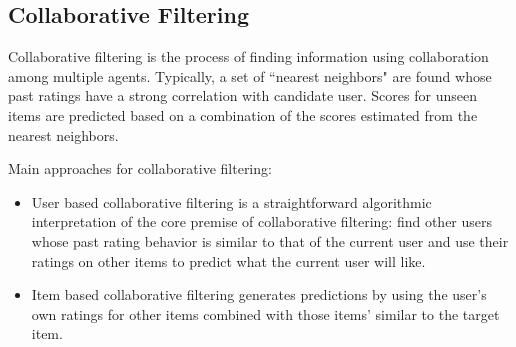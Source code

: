 \subsection{Collaborative Filtering}
 Collaborative filtering is the process of finding information using collaboration among multiple agents. Typically, a set of ``nearest neighbors" are found whose past ratings have a strong correlation with candidate user. Scores for unseen items are predicted based on a combination of the scores estimated from the nearest neighbors.

Main approaches for collaborative filtering:
\begin{itemize}
\item User based collaborative filtering  is a straightforward algorithmic interpretation of the core premise of collaborative filtering: find other users whose past rating behavior is similar to that of the current user and use their ratings on other items to predict what the current user will like.
\end{itemize}
\begin{itemize}
\item Item based collaborative filtering generates predictions by using the user’s own ratings for other items combined with those items’ similar to the target item.
\end{itemize}

